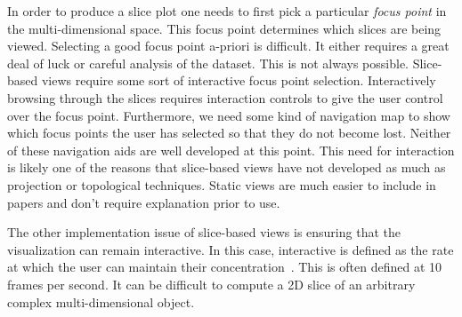 In order to produce a slice plot one needs to first pick a particular
\emph{focus point} in the multi-dimensional space. This focus point determines
which slices are being viewed. Selecting a good focus point a-priori is
difficult. 
It either requires a great deal of luck or careful analysis of the
dataset. This is not always possible. Slice-based views require some sort of
interactive focus point selection. Interactively browsing through the slices
requires interaction controls to give the user control over the focus point.
Furthermore, we need some kind of navigation map to show which focus points the
user has selected so that they do not become lost. Neither of these navigation
aids are well developed at this point. This need for interaction is likely one
of the reasons that slice-based views have not developed as much as projection
or topological techniques. Static views are much easier to include in papers
and don't require explanation prior to use.

The other implementation issue of slice-based views is ensuring that the
visualization can remain interactive. In this case, interactive is defined as
the rate at which the user can maintain their
concentration~\cite{Shneiderman:1987}. This is often defined at 10 frames per
second. It can be difficult to compute a 2D slice of an arbitrary complex
multi-dimensional object. 




